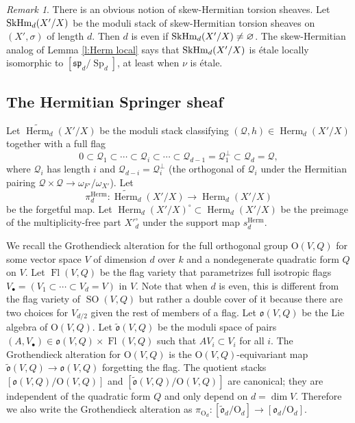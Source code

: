 \documentclass[reqno]{amsart}
\numberwithin{equation}{section}
\newcommand{\wt}[1]{\widetilde{#1}}
\DeclareMathOperator{\Sp}{Sp}
\DeclareMathOperator{\SO}{SO}
\DeclareMathOperator{\Fl}{Fl}
\DeclareMathOperator{\Herm}{Herm}
\newcommand{\SH}{\textup{SkHm}}
\newcommand{\bu}{\bullet}
\renewcommand\c{\circ}
\newcommand\vn{\varnothing}
\renewcommand\sp{\mathfrak{sp}}
\newcommand\Og{\mathrm{O}}
\newcommand{\s}{\sigma}
\newcommand{\om}{\omega}
\newcommand\cQ{\mathcal{Q}}
\newcommand\fro{\mathfrak{o}}
\theoremstyle{remark}
\newtheorem{remark}[thm]{Remark}
\numberwithin{equation}{section}
\begin{document}

\begin{remark}
There is an obvious notion of skew-Hermitian torsion sheaves. Let $\SH_{d}(X'/X)$ be the moduli stack of skew-Hermitian torsion sheaves on $(X',\s)$ of length $d$. Then $d$ is even if $\SH_{d}(X'/X)\ne\vn$. The skew-Hermitian analog of Lemma \ref{l:Herm local} says that $\SH_{d}(X'/X)$ is \'etale locally isomorphic to $[\sp_{d}/\Sp_{d}]$, at least  when $\nu$ is \'etale.
\end{remark}



\subsection{The Hermitian Springer sheaf}\label{ss:Herm Spr}  
Let $\wt\Herm_{d}(X'/X)$ be the moduli stack classifying $(\cQ,h)\in \Herm_{d}(X'/X)$ together with a full flag
\begin{equation*}
0\subset \cQ_{1}\subset \cdots \subset \cQ_{i}\subset \cdots \subset \cQ_{d-1}=\cQ_{1}^{\bot}\subset \cQ_{d}=\cQ,
\end{equation*} 
where $\cQ_{i}$ has length $i$ and $\cQ_{d-i}=\cQ_{i}^{\bot}$ (the orthogonal of $\cQ_{i}$ under the Hermitian pairing $\cQ\times \cQ\to \om_{F'}/\om_{X'}$). Let
\begin{equation*}
\pi^{\Herm}_{d}: \wt\Herm_{d}(X'/X)\to \Herm_{d}(X'/X)
\end{equation*}
be the forgetful map.  Let $\Herm_{d}(X'/X)^{\c}\subset \Herm_{d}(X'/X)$ be the preimage of the multiplicity-free part  $X'^{\c}_{d}$ under the support map $s^{\Herm}_{d}$.



We recall the Grothendieck alteration for the full orthogonal group $\Og(V,Q)$ for some vector space $V$ of dimension $d$ over $k$ and a nondegenerate quadratic form $Q$ on $V$. Let $\Fl(V,Q)$ be the flag variety that parametrizes full isotropic flags $V_{\bu}=(V_{1}\subset \cdots\subset V_{d}=V)$ in $V$. Note that when $d$ is even, this is different from the flag variety of $\SO(V,Q)$ but rather a double cover of it because there are two choices for $V_{d/2}$ given the rest of members of a flag. Let $\fro(V,Q)$ be the Lie algebra of $\Og(V,Q)$. Let $\wt\fro(V,Q)$ be the moduli space of pairs $(A, V_{\bu})\in \fro(V,Q)\times\Fl(V,Q)$ such that $AV_{i}\subset V_{i}$ for all $i$. The Grothendieck alteration for $\Og(V,Q)$ is the $\Og(V,Q)$-equivariant map $\wt\fro(V,Q)\to \fro(V,Q)$ forgetting the flag. The quotient stacks $[\fro(V,Q)/\Og(V,Q)]$ and $[\wt\fro(V,Q)/\Og(V,Q)]$ are canonical; they are independent of the quadratic form $Q$ and only depend on $d=\dim V$. Therefore we also write the Grothendieck alteration as $\pi_{\Og_{d}}: [\wt\fro_{d}/\Og_{d}]\to [\fro_{d}/\Og_{d}]$.
\end{document}
